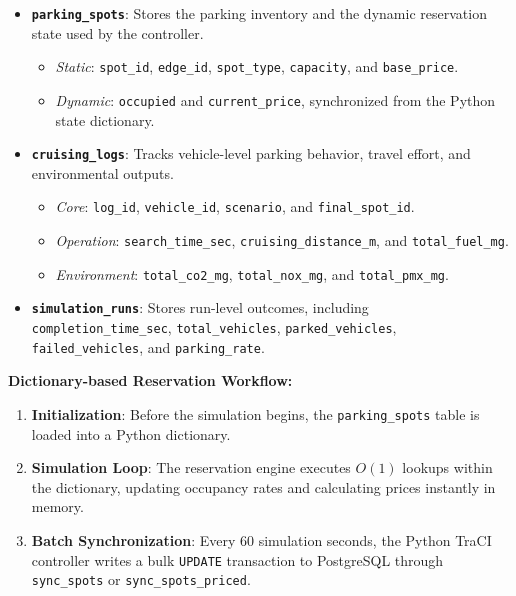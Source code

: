 \documentclass[conference]{IEEEtran}
\begin{document}
\begin{itemize}
    \item \textbf{\texttt{parking\_spots}}: Stores the parking inventory and the dynamic reservation state used by the controller.
          \begin{itemize}
              \item \textit{Static}: \texttt{spot\_id}, \texttt{edge\_id}, \texttt{spot\_type}, \texttt{capacity}, and \texttt{base\_price}.
              \item \textit{Dynamic}: \texttt{occupied} and \texttt{current\_price}, synchronized from the Python state dictionary.
          \end{itemize}
    \item \textbf{\texttt{cruising\_logs}}: Tracks vehicle-level parking behavior, travel effort, and environmental outputs.
          \begin{itemize}
              \item \textit{Core}: \texttt{log\_id}, \texttt{vehicle\_id}, \texttt{scenario}, and \texttt{final\_spot\_id}.
              \item \textit{Operation}: \texttt{search\_time\_sec}, \texttt{cruising\_distance\_m}, and \texttt{total\_fuel\_mg}.
              \item \textit{Environment}: \texttt{total\_co2\_mg}, \texttt{total\_nox\_mg}, and \texttt{total\_pmx\_mg}.
          \end{itemize}
    \item \textbf{\texttt{simulation\_runs}}: Stores run-level outcomes, including \texttt{completion\_time\_sec}, \texttt{total\_vehicles}, \texttt{parked\_vehicles}, \texttt{failed\_vehicles}, and \texttt{parking\_rate}.
\end{itemize}

\textbf{Dictionary-based Reservation Workflow:}
\begin{enumerate}
    \item \textbf{Initialization}: Before the simulation begins, the \texttt{parking\_spots} table is loaded into a Python dictionary.
    \item \textbf{Simulation Loop}: The reservation engine executes $O(1)$ lookups within the dictionary, updating occupancy rates and calculating prices instantly in memory.
    \item \textbf{Batch Synchronization}: Every 60 simulation seconds, the Python TraCI controller writes a bulk \texttt{UPDATE} transaction to PostgreSQL through \texttt{sync\_spots} or \texttt{sync\_spots\_priced}.
\end{enumerate}
\end{document}
